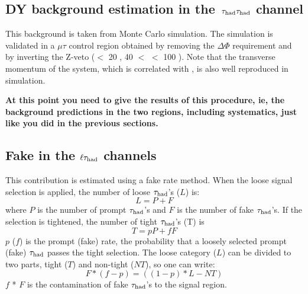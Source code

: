 \subsection{\texorpdfstring{DY background estimation in the $\,\tau_{\rm had}\tau_{\rm had}$ channel}{DY background estimation in the tau-tau channel}}
This background is taken from Monte Carlo simulation.  The simulation is 
validated in a $\mu \tau$ control region obtained by removing the $\Delta \Phi$
requirement and by
inverting the Z-veto
(\mttwo $<$ 20 \GeV, 40 $<$ \tauMT $<$ 100 \GeV).  Note that the transverse momentum 
of the \Z system, which is correlated with 
\mttwo, is also well reproduced in simulation.

{\bf At this point you need to give the results of this procedure, ie, the
background predictions in the two regions, including systematics,
just like you did in the previous sections.}



\subsection{\texorpdfstring{Fake \Tau in the $\ell\tau_{\rm had}$ channels}{Fake tau the in lepton-tau channels}}

This contribution is estimated using a fake rate method.
When the loose signal selection is applied, the number of loose $\tau_{\rm had}$'s ($L$) is:
\begin{equation}
L = P + F
\end{equation}
where $P$ is the number of prompt $\tau_{\rm had}$'s and $F$ is the number of fake 
$\tau_{\rm had}$'s. If the selection is tightened, the number of tight $\tau_{\rm had}$'s (T) is
\begin{equation}
 T = pP + fF
\end{equation} 
$p$ ($f$) is the prompt (fake) rate, the probability that a loosely selected prompt (fake) $\tau_{\rm had}$ passes the  tight  selection. 
The loose category ($L$) can be divided to two parts, 
tight ($T$) and non-tight ($NT$), so one can write:
\begin{equation}
   F * (f - p) = ((1 - p) * L - NT)
\end{equation}
$f$ * $F$ is the contamination of fake $\tau_{\rm had}$'s to the signal region. 

